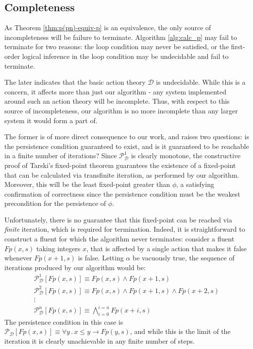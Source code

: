 \subsection{Completeness}

As Theorem \ref{thm:p(pn)-equiv-p} is an equivalence, the only source
of incompleteness will be failure to terminate. Algorithm \ref{alg:calc_p}
may fail to terminate for two reasons: the loop condition may never
be satisfied, or the first-order logical inference in the loop condition
may be undecidable and fail to terminate.

The later indicates that the basic action theory $\mathcal{D}$ is
undecidable. While this is a concern, it affects more than just our
algorithm - any system implemented around such an action theory will
be incomplete. Thus, with respect to this source of incompleteness,
our algorithm is no more incomplete than any larger system it would
form a part of.

The former is of more direct consequence to our work, and raises two
questions: is the persistence condition guaranteed to exist, and is
it guaranteed to be reachable in a finite number of iterations? Since
$\mathcal{P}_{\mathcal{D}}^{1}$ is clearly monotone, the constructive
proof of Tarski's fixed-point theorem \citep{cousot79constructive_tarski}
guarantees the existence of a fixed-point that can be calculated via
transfinite iteration, as performed by our algorithm. Moreover, this
will be the least fixed-point greater than $\phi$, a satisfying confirmation
of correctness since the persistence condition must be the weakest
precondition for the persistence of $\phi$.

Unfortunately, there is no guarantee that this fixed-point can be
reached via \emph{finite} iteration, which is required for termination.
Indeed, it is straightforward to construct a fluent for which the
algorithm never terminates: consider a fluent $Fp(x,s)$ taking integers
$x$, that is affected by a single action that makes it false whenever
$Fp(x+1,s)$ is false. Letting $\alpha$ be vacuously true, the sequence
of iterations produced by our algorithm would be:\begin{gather*}
\mathcal{P}_{\mathcal{D}}^{1}[Fp(x,s)]\equiv Fp(x,s)\wedge Fp(x+1,s)\\
\mathcal{P}_{\mathcal{D}}^{2}[Fp(x,s)]\equiv Fp(x,s)\wedge Fp(x+1,s)\wedge Fp(x+2,s)\\
\vdots\\
\mathcal{P}_{\mathcal{D}}^{n}[Fp(x,s)]\equiv\bigwedge_{i=0}^{i=n}Fp(x+i,s)\end{gather*}
 The persistence condition in this case is $\mathcal{P}_{\mathcal{D}}[Fp(x,s)]\equiv\forall y\,.\, x\leq y\rightarrow Fp(y,s)$,
and while this is the limit of the iteration it is clearly unachievable
in any finite number of steps.


